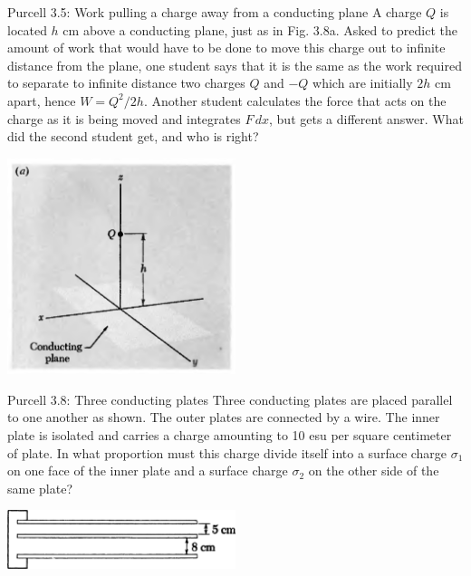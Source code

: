 \documentclass{esg8022pset}
\renewcommand{\d}{\,d}
\begin{document}
\begin{problem}{Purcell 3.5: Work pulling a charge away from a conducting plane}
  A charge $Q$ is located $h$ cm above a conducting plane, just as
  in Fig. 3.8a. Asked to predict the amount of work that would have
  to be done to move this charge out to infinite distance from the
  plane, one student says that it is the same as the work required to
  separate to infinite distance two charges $Q$ and $-Q$ which are
  initially $2h$ cm apart, hence $W = Q^2 / 2h$. Another student
  calculates the force that acts on the charge as it is being moved
  and integrates $F \d x$, but gets a different answer. What did the
  second student get, and who is right?
  \begin{center}\includegraphics[width=0.5\textwidth]{ps04_03}\end{center}
\end{problem}
\begin{solution}
  
\end{solution}








\begin{problem}{Purcell 3.8: Three conducting plates}
  Three conducting plates are placed parallel to one another as
  shown. The outer plates are connected by a wire. The inner plate
  is isolated and carries a charge amounting to 10 esu per square
  centimeter of plate. In what proportion must this charge divide
  itself into a surface charge $\sigma_1$ on one face of the inner
  plate and a surface charge $\sigma_2$ on the other side of the
  same plate?
  \begin{center}\includegraphics[width=0.5\textwidth]{ps04_04}\end{center}
\end{problem}
\begin{solution}

\end{solution}
\end{document}
